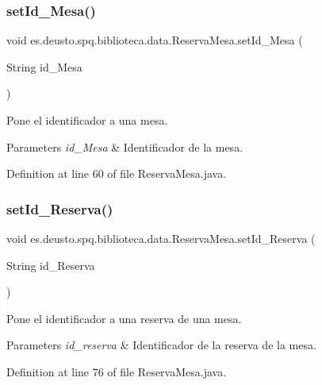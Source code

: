 \subsubsection{\texorpdfstring{set\+Id\+\_\+\+Mesa()}{setId\_Mesa()}}
{\footnotesize\ttfamily void es.\+deusto.\+spq.\+biblioteca.\+data.\+Reserva\+Mesa.\+set\+Id\+\_\+\+Mesa (\begin{DoxyParamCaption}\item[{String}]{id\+\_\+\+Mesa }\end{DoxyParamCaption})}

Pone el identificador a una mesa. 
\begin{DoxyParams}{Parameters}
{\em id\+\_\+\+Mesa} & Identificador de la mesa. \\
\hline
\end{DoxyParams}


Definition at line 60 of file Reserva\+Mesa.\+java.

\mbox{\label{classes_1_1deusto_1_1spq_1_1biblioteca_1_1data_1_1_reserva_mesa_a2bd6ff081c35a0a4f1c89a1637fbde24}} 
\subsubsection{\texorpdfstring{set\+Id\+\_\+\+Reserva()}{setId\_Reserva()}}
{\footnotesize\ttfamily void es.\+deusto.\+spq.\+biblioteca.\+data.\+Reserva\+Mesa.\+set\+Id\+\_\+\+Reserva (\begin{DoxyParamCaption}\item[{String}]{id\+\_\+\+Reserva }\end{DoxyParamCaption})}

Pone el identificador a una reserva de una mesa. 
\begin{DoxyParams}{Parameters}
{\em id\+\_\+reserva} & Identificador de la reserva de la mesa. \\
\hline
\end{DoxyParams}


Definition at line 76 of file Reserva\+Mesa.\+java.

\mbox{\label{classes_1_1deusto_1_1spq_1_1biblioteca_1_1data_1_1_reserva_mesa_a48006f59f723921fd3ff524fa040d061}} 
